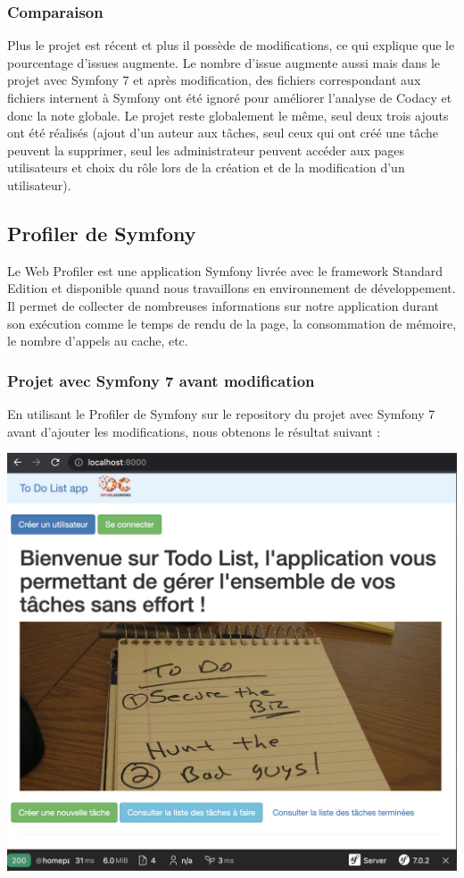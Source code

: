 \documentclass{article}
\theoremstyle{definition}
\theoremstyle{remark}
\begin{document}
\subsubsection{Comparaison}

Plus le projet est récent et plus il possède de modifications, ce qui explique que le pourcentage d'issues augmente. Le nombre d'issue augmente aussi mais dans le projet avec Symfony 7 et après modification, des fichiers correspondant aux fichiers internent à Symfony ont été ignoré pour améliorer l'analyse de Codacy et donc la note globale. Le projet reste globalement le même, seul deux trois ajouts ont été réalisés (ajout d'un auteur aux tâches, seul ceux qui ont créé une tâche peuvent la supprimer, seul les administrateur peuvent accéder aux pages utilisateurs et choix du rôle lors de la création et de la modification d'un utilisateur).

\subsection{Profiler de Symfony}

Le Web Profiler est une application Symfony livrée avec le framework Standard Edition et disponible quand nous travaillons en environnement de développement. Il permet de collecter de nombreuses informations sur notre application durant son exécution comme le temps de rendu de la page, la consommation de mémoire, le nombre d'appels au cache, etc.

\subsubsection{Projet avec Symfony 7 avant modification}

En utilisant le Profiler de Symfony sur le repository du projet avec Symfony 7 avant d'ajouter les modifications, nous obtenons le résultat suivant : 

\includegraphics[scale=0.4]{Capture_profiler_avant_modif/Profiler_old_homepage.png}
\end{document}
